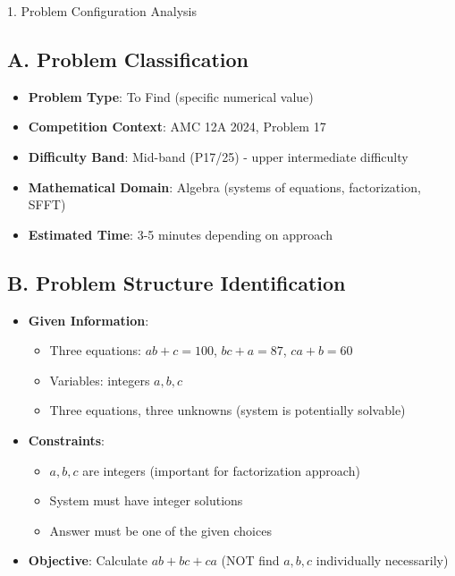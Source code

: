 \documentclass[12pt]{article}
\begin{document}
\begin{configbox}{1. Problem Configuration Analysis}

\subsection*{A. Problem Classification}
\begin{itemize}[leftmargin=*]
    \item \textbf{Problem Type}: To Find (specific numerical value)
    \item \textbf{Competition Context}: AMC 12A 2024, Problem 17
    \item \textbf{Difficulty Band}: Mid-band (P17/25) - upper intermediate difficulty
    \item \textbf{Mathematical Domain}: Algebra (systems of equations, factorization, SFFT)
    \item \textbf{Estimated Time}: 3-5 minutes depending on approach
\end{itemize}

\subsection*{B. Problem Structure Identification}
\begin{itemize}[leftmargin=*]
    \item \textbf{Given Information}: 
    \begin{itemize}
        \item Three equations: $ab + c = 100$, $bc + a = 87$, $ca + b = 60$
        \item Variables: integers $a, b, c$
        \item Three equations, three unknowns (system is potentially solvable)
    \end{itemize}
    
    \item \textbf{Constraints}: 
    \begin{itemize}
        \item $a, b, c$ are integers (important for factorization approach)
        \item System must have integer solutions
        \item Answer must be one of the given choices
    \end{itemize}
    
    \item \textbf{Objective}: Calculate $ab + bc + ca$ (NOT find $a, b, c$ individually necessarily)
    

\end{itemize}
\end{configbox}
\end{document}
